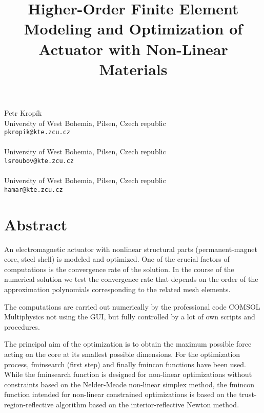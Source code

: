 \title{Higher-Order Finite Element Modeling and Optimization of Actuator with Non-Linear Materials }
\author{}  \institute{}
\maketitle
\begin{center}
{\large Petr Krop\'{i}k}\\
University of West Bohemia, Pilsen, Czech republic\\
{\tt pkropik@kte.zcu.cz}
\\ \\
University of West Bohemia, Pilsen, Czech republic\\
{\tt lsroubov@kte.zcu.cz}
\\ \vspace{4mm}{\large Roman Hamar}\\
University of West Bohemia, Pilsen, Czech republic\\
{\tt hamar@kte.zcu.cz}

\end{center}

\section*{Abstract}

An electromagnetic actuator with nonlinear structural parts (permanent-magnet core, steel shell) is modeled and optimized. One of the crucial factors of computations is the convergence rate of the solution. In the course of the numerical solution we test the convergence rate that depends on the order of the approximation polynomials corresponding to the related mesh elements.

The computations are carried out numerically by the professional code COMSOL Multiphysics not using the GUI, but fully controlled by a lot of own scripts and procedures.

The principal aim of the optimization is to obtain the maximum possible force acting on the core at its smallest possible dimensions. For the optimization process, fminsearch (first step) and finally fmincon functions have been used. While the fminsearch function is designed for non-linear optimizations without constraints based on the Nelder-Meade non-linear simplex method, the fmincon function intended for non-linear constrained optimizations is based on the trust-region-reflective algorithm based on the interior-reflective Newton method.

